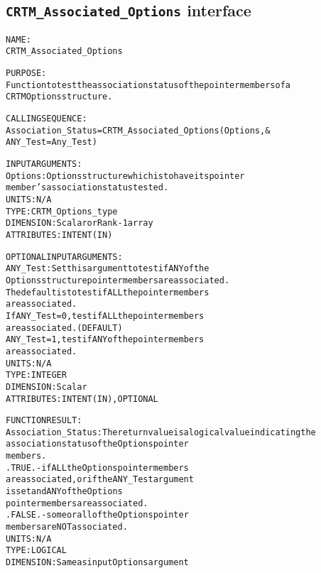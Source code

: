 \subsection{\texttt{CRTM\_Associated\_Options} interface}
  \label{sec:CRTM_Associated_Options_interface}
  \begin{alltt}
 
  NAME:
        CRTM_Associated_Options
 
  PURPOSE:
        Function to test the association status of the pointer members of a
        CRTM Options structure.
 
  CALLING SEQUENCE:
        Association_Status = CRTM_Associated_Options( Options          , &
                                                      ANY_Test=Any_Test  )
 
  INPUT ARGUMENTS:
        Options:             Options structure which is to have its pointer
                             member's association status tested.
                             UNITS:      N/A
                             TYPE:       CRTM_Options_type
                             DIMENSION:  Scalar or Rank-1 array
                             ATTRIBUTES: INTENT(IN)
 
  OPTIONAL INPUT ARGUMENTS:
        ANY_Test:            Set this argument to test if ANY of the
                             Options structure pointer members are associated.
                             The default is to test if ALL the pointer members
                             are associated.
                             If ANY_Test = 0, test if ALL the pointer members
                                              are associated.  (DEFAULT)
                                ANY_Test = 1, test if ANY of the pointer members
                                              are associated.
                             UNITS:      N/A
                             TYPE:       INTEGER
                             DIMENSION:  Scalar
                             ATTRIBUTES: INTENT(IN), OPTIONAL
 
  FUNCTION RESULT:
        Association_Status:  The return value is a logical value indicating the
                             association status of the Options pointer
                             members.
                             .TRUE.  - if ALL the Options pointer members
                                       are associated, or if the ANY_Test argument
                                       is set and ANY of the Options
                                       pointer members are associated.
                             .FALSE. - some or all of the Options pointer
                                       members are NOT associated.
                             UNITS:      N/A
                             TYPE:       LOGICAL
                             DIMENSION:  Same as input Options argument
 
  \end{alltt}
